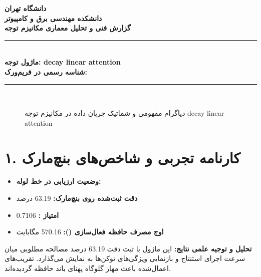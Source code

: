 \documentclass[12pt,a4paper]{article}
\begin{document}
\begin{center}
{\Large\bfseries دانشگاه تهران}\\[0.2cm]
{\large\bfseries دانشکده مهندسی برق و کامپیوتر}\\[0.2cm]
{\large\bfseries گزارش فنی و تحلیل معماری مکانیزم توجه}\\[0.5cm]
\rule{\linewidth}{1pt}\\[0.3cm]
{\LARGE\bfseries ماژول توجه: decay linear attention}\\[0.2cm]
{\large \textbf{شناسه رسمی در فریم‌ورک:} }\\[0.2cm]
\rule{\linewidth}{1pt}\\[0.5cm]
\end{center}

\begin{figure}[H]
\centering
{}
\caption{دیاگرام مفهومی و شماتیک جریان داده در مکانیزم توجه decay linear attention}
\end{figure}

\section*{۱. کارنامه تجربی و شاخص‌های بنچ‌مارک}
\begin{itemize}
\item \textbf{وضعیت ارزیابی در خط لوله:} 
\item \textbf{دقت ثبت‌شده روی بنچ‌مارک:} 63.19 درصد
\item \textbf{امتیاز :} 0.7106
\item \textbf{اوج مصرف حافظه فعال‌سازی ():} 570.16 مگابایت
\end{itemize}
\textbf{تحلیل و توجیه علمی نتایج:} این ماژول با ثبت دقت 63.19 درصد مصالحه مطلوبی میان سرعت اجرای استنتاج و بازنمایی ویژگی‌های توکن‌ها به نمایش می‌گذارد. تقریب‌های اعمال‌شده باعث مهار گلوگاه پهنای باند حافظه گردیده‌اند.
\end{document}
